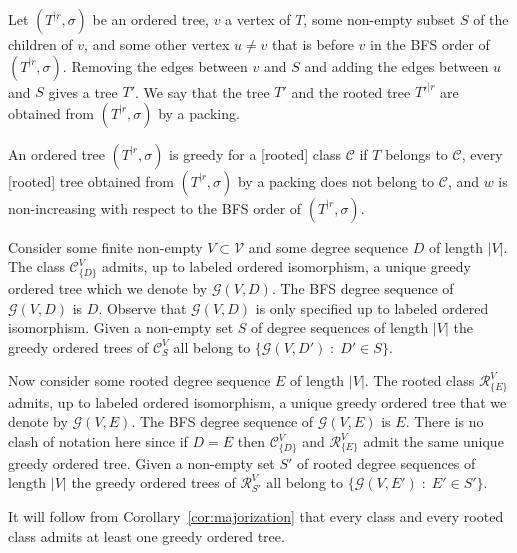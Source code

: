 \documentclass[11 pt]{modarticle}
\newcommand{\vset}{\mathcal{V}}
\newcommand{\wmap}{w}
\newcommand{\size}[1]{|#1|}
\newcommand{\rtree}[2]{{#1}^{\lvert #2}}
\newcommand{\ortree}[3]{(\rtree{#1}{#2},{#3})}
\newcommand{\tclass}{\mathcal{C}}
\newcommand{\rtclass}{\mathcal{R}}
\newcommand{\greedy}[2]{\mathcal{G}(#1,#2)}
\newcommand{\pclass}[2]{\tclass^{#1}_{#2}}
\newcommand{\rpclass}[2]{\rtclass^{#1}_{#2}}
\begin{document}
\begin{defi}
Let $\ortree{T}{r}{\sigma}$ be an ordered tree, $v$ a vertex of $T$, some non-empty subset $S$ of the children of $v$, and some other vertex $u \neq v$ that is before $v$ in the BFS order of $\ortree{T}{r}{\sigma}$. Removing the edges between $v$ and $S$ and adding the edges between $u$ and $S$ gives a tree $T'$. We say that the tree $T'$ and the rooted tree $\rtree{T'}{r}$ are obtained from $\ortree{T}{r}{\sigma}$ by a packing.
\end{defi}

\begin{defi}
An ordered tree $\ortree{T}{r}{\sigma}$ is greedy for a [rooted] class $\tclass$ if $T$ belongs to $\tclass$, every [rooted] tree obtained from $\ortree{T}{r}{\sigma}$ by a packing does not belong to $\tclass$, and $\wmap$ is non-increasing with respect to the BFS order of $\ortree{T}{r}{\sigma}$.
\end{defi}

Consider some finite non-empty $V \subset \vset$ and some degree sequence $D$ of length $\size{V}$. The class $\pclass{V}{\{D\}}$ admits, up to labeled ordered isomorphism, a unique greedy ordered tree which we denote by $\greedy{V}{D}$. The BFS degree sequence of $\greedy{V}{D}$ is $D$. Observe that $\greedy{V}{D}$ is only specified up to labeled ordered isomorphism. Given a non-empty set $S$ of degree sequences of length $\size{V}$ the greedy ordered trees of $\pclass{V}{S}$ all belong to $\{\greedy{V}{D'} \;:\; D' \in S\}$.

Now consider some rooted degree sequence $E$ of length $\size{V}$. The rooted class $\rpclass{V}{\{E\}}$ admits, up to labeled ordered isomorphism, a unique greedy ordered tree that we denote by $\greedy{V}{E}$. The BFS degree sequence of $\greedy{V}{E}$ is $E$. There is no clash of notation here since if $D = E$ then $\pclass{V}{\{D\}}$ and $\rpclass{V}{\{E\}}$ admit the same unique greedy ordered tree. Given a non-empty set $S'$ of rooted degree sequences of length $\size{V}$ the greedy ordered trees of $\rpclass{V}{S'}$ all belong to $\{\greedy{V}{E'} \;:\; E' \in S'\}$. 

It will follow from Corollary~\ref{cor:majorization} that every class and every rooted class admits at least one greedy ordered tree.
\end{document}
